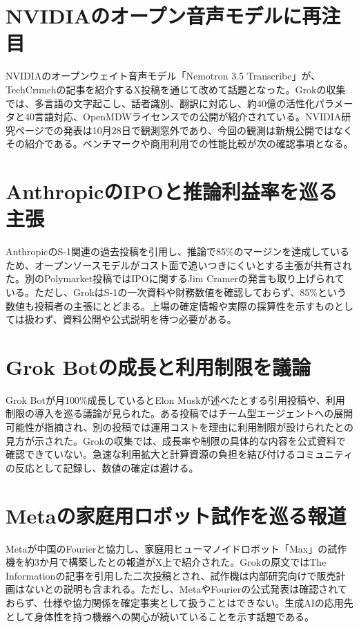 \section{NVIDIAのオープン音声モデルに再注目}
NVIDIAのオープンウェイト音声モデル「Nemotron 3.5 Transcribe」が、TechCrunchの記事を紹介するX投稿を通じて改めて話題となった。Grokの収集では、多言語の文字起こし、話者識別、翻訳に対応し、約40億の活性化パラメータと40言語対応、OpenMDWライセンスでの公開が紹介されている。NVIDIA研究ページでの発表は10月28日で観測窓外であり、今回の観測は新規公開ではなくその紹介である。ベンチマークや商用利用での性能比較が次の確認事項となる。

\section{AnthropicのIPOと推論利益率を巡る主張}
AnthropicのS-1関連の過去投稿を引用し、推論で85\%のマージンを達成しているため、オープンソースモデルがコスト面で追いつきにくいとする主張が共有された。別のPolymarket投稿ではIPOに関するJim Cramerの発言も取り上げられている。ただし、GrokはS-1の一次資料や財務数値を確認しておらず、85\%という数値も投稿者の主張にとどまる。上場の確定情報や実際の採算性を示すものとしては扱わず、資料公開や公式説明を待つ必要がある。

\section{Grok Botの成長と利用制限を議論}
Grok Botが月100\%成長しているとElon Muskが述べたとする引用投稿や、利用制限の導入を巡る議論が見られた。ある投稿ではチーム型エージェントへの展開可能性が指摘され、別の投稿では運用コストを理由に利用制限が設けられたとの見方が示された。Grokの収集では、成長率や制限の具体的な内容を公式資料で確認できていない。急速な利用拡大と計算資源の負担を結び付けるコミュニティの反応として記録し、数値の確定は避ける。

\section{Metaの家庭用ロボット試作を巡る報道}
Metaが中国のFourierと協力し、家庭用ヒューマノイドロボット「Max」の試作機を約3か月で構築したとの報道がX上で紹介された。Grokの原文ではThe Informationの記事を引用した二次投稿とされ、試作機は内部研究向けで販売計画はないとの説明も含まれる。ただし、MetaやFourierの公式発表は確認されておらず、仕様や協力関係を確定事実として扱うことはできない。生成AIの応用先として身体性を持つ機器への関心が続いていることを示す話題である。

